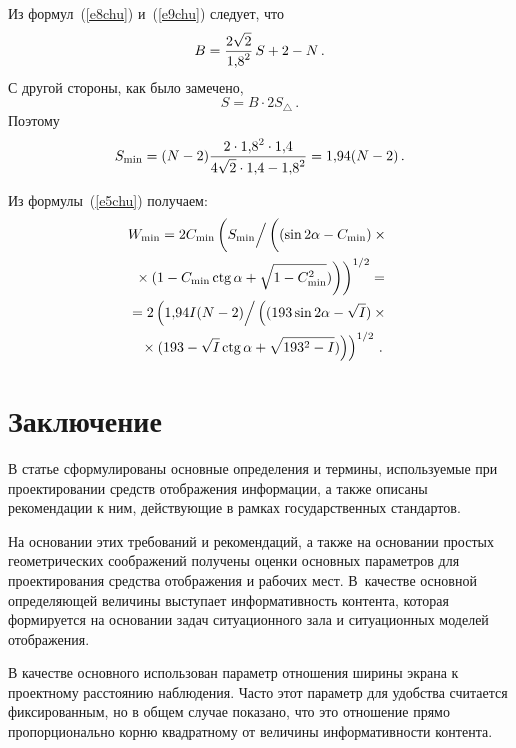 \begin{multicols}{2}
Из формул~(\ref{e8chu}) и~(\ref{e9chu}) следует, что
\begin{equation*}
B=\displaystyle\frac{\displaystyle 2\sqrt{2}\mathstrut}{\displaystyle 1{,}8^2\mathstrut}\,S+2-N\,.
\end{equation*}
С другой стороны, как было замечено,
\begin{equation*}
S=B\cdot 2S_{\triangle}\,.
\end{equation*}
Поэтому
\begin{equation*}
S_{\min} =(N-2)\displaystyle\frac{\displaystyle 2\cdot 1{,}8^2\cdot1{,}4\mathstrut}{\displaystyle 4\sqrt{2}\cdot1{,}4-
1{,}8^2\mathstrut}=1{,}94(N-2)\,.
\end{equation*}

Из формулы~(\ref{e5chu}) получаем:
\begin{multline*}
W_{\min} =2C_{\min}
\left(
{S_{\min}}\Big /\left(\vphantom{\sqrt{1-C^2_{\min}}}(
\sin2\alpha-C_{\min})\times{}\right.\right.\\
\left.\left.{}\times(1-
C_{\min}\ctg\alpha+\sqrt{1-C^2_{\min}})\right)\right)^{1/2}={}\\
{}=2
\left(
{1{,}94I(N-2)}\Big /\left(\vphantom{\sqrt{193^2-I}}
(193\sin2\alpha-\sqrt{I})\times{}\right.\right.\\
\left.\left.{}\times (193-
\sqrt{I}\ctg\alpha+\sqrt{193^2-I})\right)\right)^{1/2}\,.
\end{multline*}


\section{Заключение}

В статье сформулированы основные определения и термины, используемые 
при проектировании средств отображения информации, а также описаны 
рекомендации к ним, действующие в рамках государственных стандартов.

На основании этих требований и рекомендаций, а также на основании 
простых геометрических соображений получены оценки основных 
параметров для проектирования средства отображения и рабочих мест. 
В~качестве основной определяющей величины выступает информативность 
контента, которая формируется на основании задач ситуационного зала и 
ситуационных моделей отображения.
     
     В качестве основного использован параметр отношения ширины экрана 
к проектному расстоянию наблюдения. Часто этот параметр для удобства 
считается фиксированным, но в общем случае показано, что это отношение 
прямо пропорционально корню квадратному от величины информативности 
контента.
    

\end{multicols}
